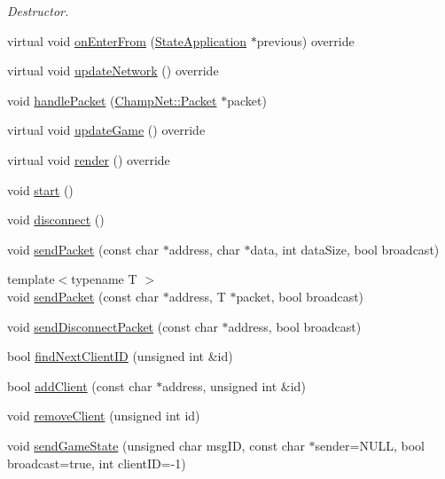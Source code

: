 \begin{DoxyCompactItemize}
\begin{DoxyCompactList}\small\item\em Destructor. \end{DoxyCompactList}\item 
virtual void \hyperlink{class_state_server_ae1517f9d264d1fb39c16512477caa83e}{on\-Enter\-From} (\hyperlink{class_state_application}{State\-Application} $\ast$previous) override
\item 
virtual void \hyperlink{class_state_server_aceb9a260a5c4a4d46607e8fe71be2667}{update\-Network} () override
\item 
void \hyperlink{class_state_server_a8983232b9935b74fda71ed409b45c7fd}{handle\-Packet} (\hyperlink{class_champ_net_1_1_packet}{Champ\-Net\-::\-Packet} $\ast$packet)
\item 
virtual void \hyperlink{class_state_server_afc726acef321e4fd0b9f3aeacb126845}{update\-Game} () override
\item 
virtual void \hyperlink{class_state_server_afb476eb4f969490b00944a93157b76c8}{render} () override
\item 
void \hyperlink{class_state_server_aaeb4f49e47304f186f87f79a3612b085}{start} ()
\item 
void \hyperlink{class_state_server_a066a1d342ca796d2f40d273dc375a032}{disconnect} ()
\item 
void \hyperlink{class_state_server_ab03b5fe855178bbfa7ec2741b7a08172}{send\-Packet} (const char $\ast$address, char $\ast$data, int data\-Size, bool broadcast)
\item 
{\footnotesize template$<$typename T $>$ }\\void \hyperlink{class_state_server_a88bda7a0bfd4878781f4676e3b4b19bd}{send\-Packet} (const char $\ast$address, T $\ast$packet, bool broadcast)
\item 
void \hyperlink{class_state_server_a4ba2a2bde5a70c0aa50ad936ca88ad44}{send\-Disconnect\-Packet} (const char $\ast$address, bool broadcast)
\item 
bool \hyperlink{class_state_server_afcde4aa297197e9f2840d24612501b5a}{find\-Next\-Client\-I\-D} (unsigned int \&id)
\item 
bool \hyperlink{class_state_server_a4f6675bef8d34e3e3ffbe3e71e16732e}{add\-Client} (const char $\ast$address, unsigned int \&id)
\item 
void \hyperlink{class_state_server_aa1feeeb495d9bf60f5750323e839c02d}{remove\-Client} (unsigned int id)
\item 
void \hyperlink{class_state_server_a7d80660aa2ef7ab52ce8c86752abf145}{send\-Game\-State} (unsigned char msg\-I\-D, const char $\ast$sender=N\-U\-L\-L, bool broadcast=true, int client\-I\-D=-\/1)
\end{DoxyCompactItemize}
